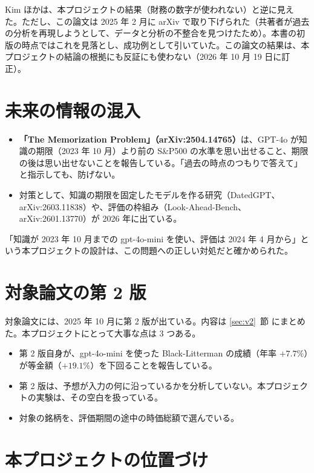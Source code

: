 \documentclass[xelatex,ja=standard,jafont=hiragino-pron,a4paper,10pt]{bxjsreport}
\newcommand{\SP}{S\&P500}
\newcommand{\secref}[1]{\ref{#1}~節}
\begin{document}
Kim ほかは、本プロジェクトの結果（財務の数字が使われない）と逆に見えた。ただし、この論文は 2025 年 2 月に arXiv で取り下げられた（共著者が過去の分析を再現しようとして、データと分析の不整合を見つけたため）。本書の初版の時点ではこれを見落とし、成功例として引いていた。この論文の結果は、本プロジェクトの結論の根拠にも反証にも使わない（2026 年 10 月 19 日に訂正）。

\section{未来の情報の混入}

\begin{itemize}
\item \textbf{「The Memorization Problem」（arXiv:2504.14765）}は、GPT-4o が知識の期限（2023 年 10 月）より前の \SP{} の水準を思い出せること、期限の後は思い出せないことを報告している。「過去の時点のつもりで答えて」と指示しても、防げない。
\item 対策として、知識の期限を固定したモデルを作る研究（DatedGPT、arXiv:2603.11838）や、評価の枠組み（Look-Ahead-Bench、arXiv:2601.13770）が 2026 年に出ている。
\end{itemize}

「知識が 2023 年 10 月までの gpt-4o-mini を使い、評価は 2024 年 4 月から」という本プロジェクトの設計は、この問題への正しい対処だと確かめられた。

\section{対象論文の第 2 版}

対象論文には、2025 年 10 月に第 2 版が出ている。内容は \secref{sec:v2} にまとめた。本プロジェクトにとって大事な点は 3 つある。

\begin{itemize}
\item 第 2 版自身が、gpt-4o-mini を使った Black-Litterman の成績（年率 $+7.7\%$）が等金額（$+19.1\%$）を下回ることを報告している。
\item 第 2 版は、予想が入力の何に沿っているかを分析していない。本プロジェクトの実験は、その空白を扱っている。
\item 対象の銘柄を、評価期間の途中の時価総額で選んでいる。
\end{itemize}

\section{本プロジェクトの位置づけ}
\end{document}
